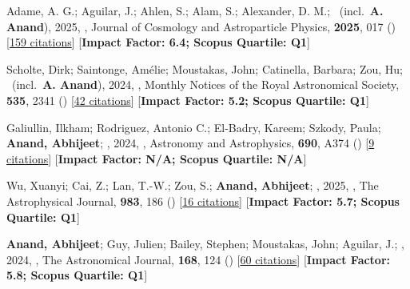 \item[{\color{numcolor}\scriptsize17}] Adame, A. G.; Aguilar, J.; Ahlen, S.; Alam, S.; Alexander, D. M.; \etal\ (incl.\ \textbf{A. Anand}), 2025, , Journal of Cosmology and Astroparticle Physics, \textbf{2025}, 017 () [\href{https://ui.adsabs.harvard.edu/abs/2025JCAP...07..017A}{159 citations}] [\textbf{Impact Factor: 6.4; Scopus Quartile: Q1}]

\item[{\color{numcolor}\scriptsize16}] Scholte, Dirk; Saintonge, Am{\'e}lie; Moustakas, John; Catinella, Barbara; Zou, Hu; \etal\ (incl.\ \textbf{A. Anand}), 2024, , Monthly Notices of the Royal Astronomical Society, \textbf{535}, 2341 () [\href{https://ui.adsabs.harvard.edu/abs/2024MNRAS.535.2341S}{42 citations}] [\textbf{Impact Factor: 5.2; Scopus Quartile: Q1}]

\item[{\color{numcolor}\scriptsize15}] Galiullin, Ilkham; Rodriguez, Antonio C.; El-Badry, Kareem; Szkody, Paula; \textbf{Anand, Abhijeet}; \etal, 2024, , Astronomy and Astrophysics, \textbf{690}, A374 () [\href{https://ui.adsabs.harvard.edu/abs/2024A&A...690A.374G}{9 citations}] [\textbf{Impact Factor: N/A; Scopus Quartile: N/A}]

\item[{\color{numcolor}\scriptsize14}] Wu, Xuanyi; Cai, Z.; Lan, T.-W.; Zou, S.; \textbf{Anand, Abhijeet}; \etal, 2025, , The Astrophysical Journal, \textbf{983}, 186 () [\href{https://ui.adsabs.harvard.edu/abs/2025ApJ...983..186W}{16 citations}] [\textbf{Impact Factor: 5.7; Scopus Quartile: Q1}]

\item[{\color{numcolor}\scriptsize13}] \textbf{Anand, Abhijeet}; Guy, Julien; Bailey, Stephen; Moustakas, John; Aguilar, J.; \etal, 2024, , The Astronomical Journal, \textbf{168}, 124 () [\href{https://ui.adsabs.harvard.edu/abs/2024AJ....168..124A}{60 citations}] [\textbf{Impact Factor: 5.8; Scopus Quartile: Q1}]

